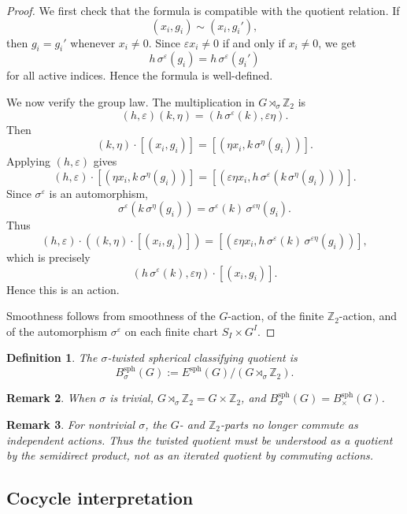 \documentclass[11pt]{amsart}
\newtheorem{definition}{Definition}[section]
\newtheorem{remark}[definition]{Remark}
\begin{document}
\begin{proof}
We first check that the formula is compatible with the quotient relation. If
\[
(x_i,g_i)\sim(x_i,g_i'),
\]
then \(g_i=g_i'\) whenever \(x_i\neq0\). Since \(\varepsilon x_i\neq0\) if and only if \(x_i\neq0\), we get
\[
h\,\sigma^\varepsilon(g_i)
=
h\,\sigma^\varepsilon(g_i')
\]
for all active indices. Hence the formula is well-defined.

We now verify the group law. The multiplication in \(G\rtimes_\sigma\mathbb Z_2\) is
\[
(h,\varepsilon)(k,\eta)
=
(h\,\sigma^\varepsilon(k),\varepsilon\eta).
\]
Then
\[
(k,\eta)\cdot[(x_i,g_i)]
=
[(\eta x_i,k\,\sigma^\eta(g_i))].
\]
Applying \((h,\varepsilon)\) gives
\[
(h,\varepsilon)\cdot[(\eta x_i,k\,\sigma^\eta(g_i))]
=
[(\varepsilon\eta x_i,
h\,\sigma^\varepsilon(k\,\sigma^\eta(g_i)))].
\]
Since \(\sigma^\varepsilon\) is an automorphism,
\[
\sigma^\varepsilon(k\,\sigma^\eta(g_i))
=
\sigma^\varepsilon(k)\,\sigma^{\varepsilon\eta}(g_i).
\]
Thus
\[
(h,\varepsilon)\cdot((k,\eta)\cdot[(x_i,g_i)])
=
[(\varepsilon\eta x_i,
h\,\sigma^\varepsilon(k)\,\sigma^{\varepsilon\eta}(g_i))],
\]
which is precisely
\[
(h\,\sigma^\varepsilon(k),\varepsilon\eta)\cdot[(x_i,g_i)].
\]
Hence this is an action.

Smoothness follows from smoothness of the \(G\)-action, of the finite \(\mathbb Z_2\)-action, and of the automorphism \(\sigma^\varepsilon\) on each finite chart \(S_I\times G^I\).
\end{proof}

\begin{definition}
The \(\sigma\)-twisted spherical classifying quotient is
\[
B^{\mathrm{sph}}_\sigma(G)
:=
E^{\mathrm{sph}}(G)/(G\rtimes_\sigma\mathbb Z_2).
\]
\end{definition}

\begin{remark}
When \(\sigma\) is trivial, \(G\rtimes_\sigma\mathbb Z_2=G\times\mathbb Z_2\), and \(B^{\mathrm{sph}}_\sigma(G)=B^{\mathrm{sph}}_{\times}(G)\).
\end{remark}

\begin{remark}
For nontrivial \(\sigma\), the \(G\)- and \(\mathbb Z_2\)-parts no longer commute as independent actions. Thus the twisted quotient must be understood as a quotient by the semidirect product, not as an iterated quotient by commuting actions.
\end{remark}

\subsection{Cocycle interpretation}
\end{document}
